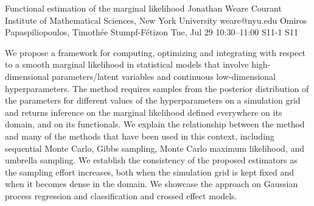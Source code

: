 \begin{talk}
  {Functional estimation of the marginal likelihood}%
  {Jonathan Weare}%
  {Courant Institute of Mathematical Sciences, New York University}%
  {weare@nyu.edu}%
  {Omiros Papaspiliopoulos, Timoth\'ee Stumpf-F\'etizon}%
  {}%
  {Tue, Jul 29 10:30--11:00}%
  {S11-1}%
  {S11}%
  
    
   
We propose a framework for computing, optimizing and integrating with respect to
a smooth marginal likelihood in statistical models that involve high-dimensional parameters/latent
variables and continuous low-dimensional hyperparameters. The method requires samples from
the posterior distribution of the parameters for different values of the hyperparameters on a simulation grid and returns inference on the marginal likelihood defined everywhere on its domain,
and on its functionals. We explain the relationship between the method and many of the methods that have been
used in this context, including sequential Monte Carlo, Gibbs sampling, Monte Carlo maximum
likelihood, and umbrella sampling. We establish the consistency of the proposed estimators as
the sampling effort increases, both when the simulation grid is kept fixed and when it becomes
dense in the domain. We showcase the approach on Gaussian process regression and classification and crossed effect models.


\end{talk}

